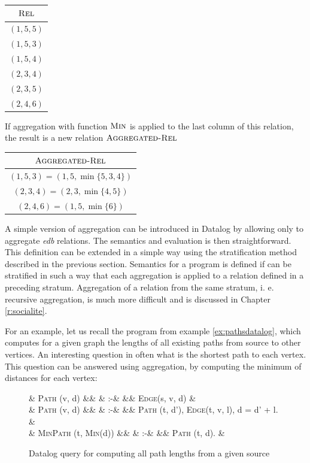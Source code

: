 \documentclass{pracamgr}
\theoremstyle{plain}
\theoremstyle{definition}
\theoremstyle{remark}
\newcommand{\assign}{:-}
\newenvironment{centab}[1]{\begin{center}\begin{tabular}{#1}}{\end{tabular}\end{center}}
\newcommand{\narrow}[1]{\begin{changemargin}{2cm}{2cm} #1 \end{changemargin}}
\newcommand{\dprog}[4]{
  \begin{figure}[h!]
    \narrow{
      #1
      \begin{flalign*}
      #2
      \end{flalign*}
      \caption{#3}
      \label{#4}
    }
\end{figure}

}
\begin{document}
\begin{centab}{ | c | }
  \hline
  $\textsc{Rel}$ \\
  \hline
  $(1, 5, 5)$ \\
  $(1, 5, 3)$ \\
  $(1, 5, 4)$ \\
  $(2, 3, 4)$ \\
  $(2, 3, 5)$ \\
  $(2, 4, 6)$ \\
  \hline
\end{centab}

If aggregation with function $\textsc{Min}$ is applied to the last column of this relation, the result is a new relation $\textsc{Aggregated-Rel}$

\begin{centab}{ | c | }
  \hline
  $\textsc{Aggregated-Rel}$ \\
  \hline
  $(1, 5, 3) = (1, 5, \min{\{5, 3, 4\}})$ \\
  $(2, 3, 4) = (2, 3, \min{\{4, 5\}})$ \\
  $(2, 4, 6) = (1, 5, \min{\{6\}})$ \\
  \hline
\end{centab}

A simple version of aggregation can be introduced in Datalog by allowing only to aggregate \emph{edb} relations. The semantics and evaluation is then straightforward. This definition can be extended in a simple way using the stratification method described in the previous section. Semantics for a program is defined if can be stratified in such a way that each aggregation is applied to a relation defined in a preceding stratum. Aggregation of a relation from the same stratum, i. e. recursive aggregation, is much more difficult and is discussed in Chapter \ref{r:socialite}.

For an example, let us recall the program from example \ref{ex:pathsdatalog}, which computes for a given graph the lengths of all existing paths from source to other vertices. An interesting question in often what is the shortest path to each vertex. This question can be answered using aggregation, by computing the minimum of distances for each vertex: 

\dprog{}{
  & \textsc{Path} (v, d) &&  & \assign & && \textsc{Edge}(s, v, d) & \\
  & \textsc{Path} (v, d) &&  & \assign & && \textsc{Path} (t, d'), \textsc{Edge}(t, v, l), d = d' + l. &\\
  & \textsc{MinPath} (t, \textsc{Min}(d)) &&  & \assign & && \textsc{Path} (t, d). &
}{Datalog query for computing all path lengths from a given source}{ex:pathsdatalogaggregate}
\end{document}

